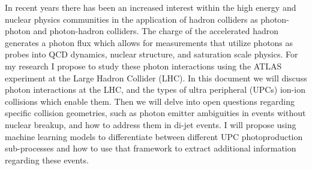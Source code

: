 In recent years there has been an increased interest within the high energy and nuclear physics communities in the application of hadron colliders as photon-photon and photon-hadron colliders. The charge of the accelerated hadron generates a photon flux which allows for measurements that utilize photons as probes into QCD dynamics, nuclear structure, and saturation scale physics. For my research I propose to study these photon interactions using the ATLAS experiment at the Large Hadron Collider (LHC). In this document we will discuss photon interactions at the LHC, and the types of ultra peripheral  (UPCs) ion-ion collisions which enable them. Then we will delve into open questions regarding specific collision geometries, such as photon emitter ambiguities in events without nuclear breakup, and how to address them in di-jet events. I will propose using machine learning models to differentiate between different UPC photoproduction sub-processes and how to use that framework to extract additional information regarding these events.